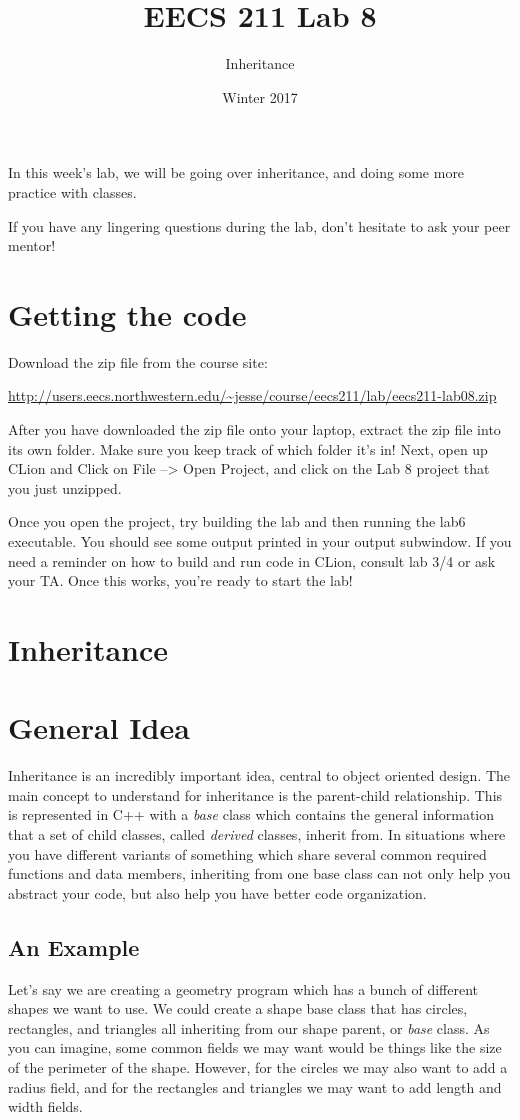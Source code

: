\documentclass{tufte-handout}
\title{EECS 211 Lab 8}
\author{Inheritance}
\date{Winter 2017}
\begin{document}
\maketitle

In this week's lab, we will be going over inheritance, and doing some more practice with classes.


If you have any lingering questions during the lab, don't hesitate to ask your peer mentor!
\section{Getting the code}
Download the zip file from the course site: \medskip

\url{http://users.eecs.northwestern.edu/~jesse/course/eecs211/lab/eecs211-lab08.zip}

\medskip \noindent
After you have downloaded the zip file onto your laptop, extract the zip file into its own folder. Make sure you keep track of which folder it's in!  Next, open up CLion and Click on File --> Open Project, and click on the Lab 8 project that you just unzipped. 

Once you open the project, try building the lab and then running the lab6 executable. 
You should see some output printed in your output subwindow.
If you need a reminder on how to build and run code in CLion, consult lab 3/4 or ask your TA.
Once this works, you're ready to start the lab!

\section{Inheritance}

\section {General Idea}
Inheritance is an incredibly important idea, central to object oriented design.
The main concept to understand for inheritance is the parent-child relationship.
This is represented in C++ with a \textit{base} class which contains the general information that a set of child classes, called \textit{derived} classes, inherit from.
In situations where you have different variants of something which share several common required functions and data members, inheriting from one base class can not only help you abstract your code, but also help you have better code organization.

\subsection{An Example}
Let's say we are creating a geometry program which has a bunch of different shapes we want to use.
We could create a shape base class that has circles, rectangles, and triangles all inheriting from our shape parent, or \textit{base} class.
As you can imagine, some common fields we may want would be things like the size of the perimeter of the shape.
However, for the circles we may also want to add a radius field, and for the rectangles and triangles we may want to add length and width fields.
\end{document}

